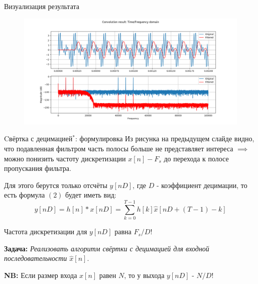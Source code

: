 \documentclass{beamer}
\begin{document}
    \begin{frame}{Визуализация результата}
        \begin{figure}[!tbp]
           \centering
           \includegraphics[width=\textwidth]{pics/result_regular.png}
           \captionsetup{justification=centering}
        \end{figure}
    \end{frame}
    \begin{frame}{Cвёртка с децимацией$^{*}$: формулировка}
        \justifying 
        Из рисунка на предыдущем слайде видно, что подавленная фильтром часть полосы больше не представляет интереса $\implies$ можно понизить частоту дискретизации $x[n] - F_{s}$ до перехода к полосе пропускания фильтра.
        \par
        Для этого берутся только отсчёты $y[nD]$, где $D$ - коэффициент децимации, то есть формула $(2)$ будет иметь вид:
        \begin{equation}
            y[nD] = h[n] * x[nD] = \sum_{k=0}^{T - 1} h[k]\hat x[nD + (T - 1) - k] \label{eq:conv_dec}
        \end{equation}
        \par
        Частота дискретизации для $y[nD]$ равна $F_{s}/D$!
        \par
        {\bf Задача:} {\it Реализовать алгоритм свёртки с децимацией для входной последовательности $\hat x[n]$}.
        \par
        {\bf NB:} Если размер входа $x[n]$ равен $N$, то у выхода $y[nD]$ - $N/D$!
    \end{frame}
\end{document}
